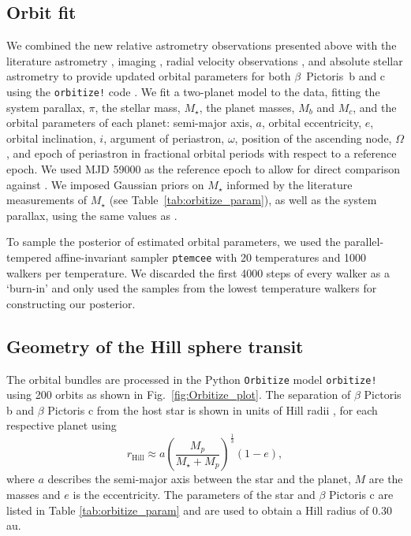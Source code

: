 \documentclass{aa}
\newcommand\picb{$\beta$ Pictoris b}
\newcommand\picc{$\beta$ Pictoris c}
\begin{document}
\subsection{Orbit fit}

We combined the new relative astrometry observations presented above with the literature astrometry \citep{Lacour_2021, Nowak_2020}, imaging \citep{Lagrange_2020, Nielsen_2020}, radial velocity observations \citep{Lagrange_2020}, and absolute stellar astrometry \citep{Brandt_2021} to provide updated orbital parameters for both $\beta$~Pictoris~b and c using the \texttt{orbitize!} code \citep{orbitize}.
%
We fit a two-planet model to the data, fitting the system parallax, $\pi$, the stellar mass, $M_\star$, the planet masses, $M_b$ and $M_c$, and the orbital parameters of each planet: semi-major axis, $a$, orbital eccentricity, $e$, orbital inclination, $i$, argument of periastron, $\omega$, position of the ascending node, $\Omega$, and epoch of periastron in fractional orbital periods with respect to a reference epoch.
%
We used MJD 59000 as the reference epoch to allow for direct comparison against \citet{Lacour_2020}.
%
We imposed Gaussian priors on $M_\star$ informed by the literature measurements of $M_\star$ (see Table~\ref{tab:orbitize_param}), as well as the system parallax, using the same values as \citet{Lacour_2021}. 

To sample the posterior of estimated orbital parameters, we used the parallel-tempered affine-invariant sampler \texttt{ptemcee} \citep{Foreman-Mackey_2013, Vousden_2016} with 20 temperatures and 1000 walkers per temperature.
%
We discarded the first 4000 steps of every walker as a `burn-in' and only used the samples from the lowest temperature walkers for constructing our posterior.
%

\subsection{Geometry of the Hill sphere transit}\label{sec:Hill_sphere_transit}
The orbital bundles are processed in the Python \verb|Orbitize| model \texttt{orbitize!} using 200 orbits as shown in Fig.~\ref{fig:Orbitize_plot}.
%
The separation of \picb{} and \picc{} from the host star is shown in units of Hill radii \citep{Hamilton_1992}, for each respective planet using
%
\begin{equation}
    r_{\text{Hill}} \approx a \left(\frac{M_p}{M_{\star}+M_p} \right)^{\frac{1}{3}}  (1-e),
\end{equation}
where $a$ describes the semi-major axis between the star and the planet, $M$ are the masses and $e$ is the eccentricity. 
%
The parameters of the star and \picc{} are listed in Table \ref{tab:orbitize_param} and are used to obtain a Hill radius of 0.30 au. 
\end{document}
